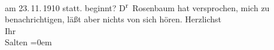\begin{ledgroupsized}[t]{13cm}
{{{                  am 23. 11. 1910
                  statt.}}}\label{K_L03546-1h} beginnt? D\textsuperscript{r} Rosenbaum hat versprochen, mich zu benachrichtigen, läßt aber
               nichts von sich hören.\pend
           \pstart
           Herzlichst {\\[\baselineskip]}Ihr {\\[\baselineskip]}\spacefill\mbox{Salten}\pend
           \leftskip=0em{}
         
         \endnumbering{}\end{ledgroupsized}  \newcommand{\dateiname}{L03546}\newcommand{\titel}{Felix Salten an Arthur Schnitzler, [22. 11. 1910?]}\newcommand{\editorInnen}{Martin Anton Müller und Laura Untner}
      